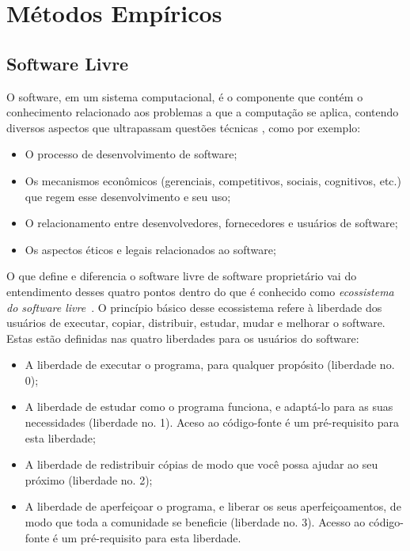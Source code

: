 \chapter{Métodos Empíricos}
\label{cap-met-emp}


\section{Software Livre}
\label{sec-swl}

O software, em um sistema computacional, é o componente que contém o conhecimento relacionado aos problemas a que a computação se aplica, contendo diversos aspectos que ultrapassam questões técnicas \cite{meirelles2013metrics}, como por exemplo: 

\begin{itemize}
\item O processo de desenvolvimento de software;
\item Os mecanismos econômicos (gerenciais, competitivos, sociais, cognitivos, etc.) que regem esse desenvolvimento e seu uso;
\item O relacionamento entre desenvolvedores, fornecedores e usuários de software;
\item Os aspectos éticos e legais relacionados ao software;
\end{itemize}

O que define e diferencia o software livre de software proprietário vai do entendimento desses quatro pontos dentro do que é conhecido como \textit{ecossistema do software livre}~\cite{meirelles2013}.
O princípio básico desse ecossistema refere à liberdade dos usuários de executar, copiar, distribuir, estudar, mudar e melhorar o software. Estas estão definidas nas quatro liberdades para os usuários do software:

\begin{itemize}
\item A liberdade de executar o programa, para qualquer propósito (liberdade no. 0);
\item A liberdade de estudar como o programa funciona, e adaptá-lo para as suas necessidades (liberdade no. 1). Aceso ao código-fonte é um pré-requisito para esta liberdade;
\item A liberdade de redistribuir cópias de modo que você possa ajudar ao seu próximo (liberdade no. 2);
\item A liberdade de aperfeiçoar o programa, e liberar os seus aperfeiçoamentos, de modo que toda a comunidade se beneficie (liberdade no. 3). Acesso ao código-fonte é um pré-requisito para esta liberdade.
\end{itemize}

